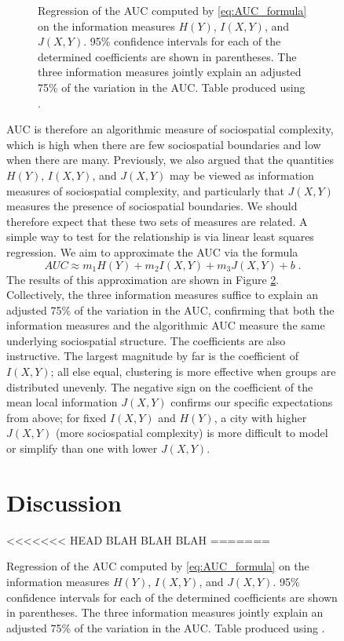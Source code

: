 \documentclass[english]{scrartcl}
\begin{document}
\begin{figure}
		\begin{figure}
			\centering
			
			\caption{Regression of the AUC computed by \eqref{eq:AUC_formula} on the information measures $H(Y)$, $I(X,Y)$, and $J(X,Y)$. 95\% confidence intervals for each of the determined coefficients are shown in parentheses. The three information measures jointly explain an adjusted 75\% of the variation in the AUC. Table produced using \cite{Marek2015}.}\label{fig:regression}
		\end{figure}

		AUC is therefore an algorithmic measure of sociospatial complexity, which is high when there are few sociospatial boundaries and low when there are many. Previously, we also argued that the quantities $H(Y)$, $I(X,Y)$, and $J(X,Y)$ may be viewed as information measures of sociospatial complexity, and particularly that $J(X,Y)$ measures the presence of sociospatial boundaries. We should therefore expect that these two sets of measures are related. A simple way to test for the relationship is via linear least squares regression. We aim to approximate the AUC via the formula
		\begin{equation*}
			AUC \approx m_1H(Y) + m_2I(X,Y) + m_3J(X,Y) + b\;.
		\end{equation*}
		The results of this approximation are shown in Figure \ref{fig:regression}. Collectively, the three information measures suffice to explain an adjusted 75\% of the variation in the AUC, confirming that both the information measures and the algorithmic AUC measure the same underlying sociospatial structure. The coefficients are also instructive. The largest magnitude by far is the coefficient of $I(X,Y)$; all else equal, clustering is more effective when groups are distributed unevenly. The negative sign on the coefficient of the mean local information $J(X,Y)$ confirms our specific expectations from above; for fixed $I(X,Y)$ and $H(Y)$, a city with higher $J(X,Y)$ (more sociospatial complexity) is more difficult to model or simplify than one with lower $J(X,Y)$. 

\section{Discussion} \label{sec:discussion}
<<<<<<< HEAD
BLAH BLAH BLAH
% 
=======


\end{figure}
\end{document}
